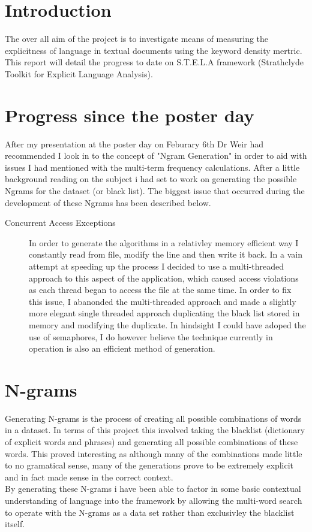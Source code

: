 \documentclass{report}
\begin{document}
\section*{Introduction}
The over all aim of the project is to investigate means of measuring the explicitness of language in textual documents using the keyword density mertric. This report will detail the progress to date on S.T.E.L.A framework (Strathclyde Toolkit for Explicit Language Analysis). 
\section*{Progress since the poster day}
After my presentation at the poster day on Feburary 6th Dr Weir had recommended I look in to the concept of "Ngram Generation" in order to aid with issues I had mentioned with the multi-term frequency calculations. After a little background reading on the subject i had set to work on generating the possible Ngrams for the dataset (or black list). The biggest issue that occurred during the development of these Ngrams has been described below.
\begin{description}
\item[Concurrent Access Exceptions]
In order to generate the algorithms in a relativley memory efficient way I constantly read from file, modify the line and then write it back. In a vain attempt at speeding up the process I decided to use a multi-threaded approach to this aspect of the application, which caused access violations as each thread began to access the file at the same time. In order to fix this issue, I abanonded the multi-threaded approach and made a slightly more elegant single threaded approach duplicating the black list stored in memory and modifying the duplicate. In hindsight I could have adoped the use of semaphores, I do however believe the technique currently in operation is also an efficient method of generation.
\end{description}

\section*{N-grams}
Generating N-grams is the process of creating all possible combinations of words in a dataset. In terms of this project this involved taking the blacklist (dictionary of explicit words and phrases) and generating all possible combinations of these words. This proved interesting as although many of the combinations made little to no gramatical sense, many of the generations prove to be extremely explicit and in fact made sense in the correct context.
\\
By generating these N-grams i have been able to factor in some basic contextual understanding of language into the framework by allowing the multi-word search to operate with the N-grams as a data set rather than exclusivley the blacklist itself.
\\
\\
\end{document}
